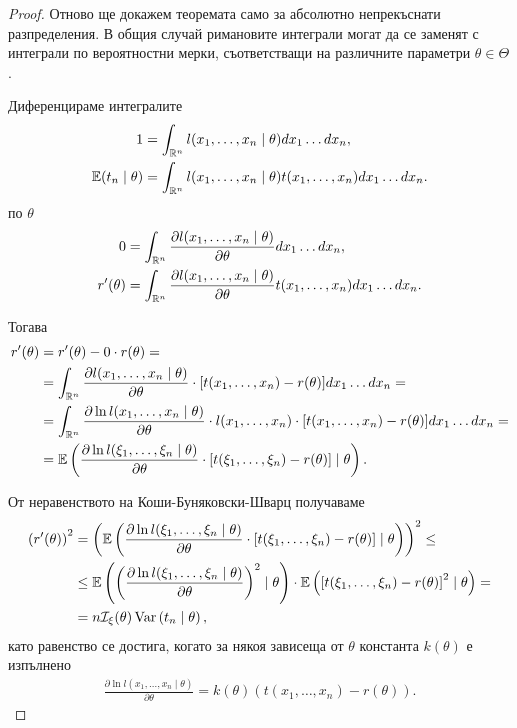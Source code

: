 \documentclass[numbers=endperiod, bibliography=totocnumbered]{scrartcl}
\begin{document}
\begin{proof}
  Отново ще докажем теоремата само за абсолютно непрекъснати разпределения. В общия случай римановите интеграли могат да се заменят с интеграли по вероятностни мерки, съответстващи на различните параметри \( \theta \in \Theta \).

  Диференцираме интегралите
  \begin{align*}
     1 &= \int_{\mathbb{R}^n} l(x_1, \ldots, x_n \mid \theta) dx_1 \ldots dx_n,
     \\
     \mathbb{E}(t_n \mid \theta) &= \int_{\mathbb{R}^n} l(x_1, \ldots, x_n \mid \theta) t(x_1, \ldots, x_n) dx_1 \ldots dx_n.
  \end{align*}
  по \( \theta \)
  \begin{align*}
     0 &= \int_{\mathbb{R}^n} \frac {\partial l(x_1, \ldots, x_n \mid \theta)} {\partial \theta} dx_1 \ldots dx_n,
     \\
     r'(\theta) &= \int_{\mathbb{R}^n} \frac {\partial l(x_1, \ldots, x_n \mid \theta)} {\partial \theta} t(x_1, \ldots, x_n) dx_1 \ldots dx_n.
  \end{align*}

  Тогава
  \begin{align*}
    r'(\theta)
    &=
    r'(\theta) - 0 \cdot r(\theta)
    = \\ &=
    \int_{\mathbb{R}^n} \frac {\partial l(x_1, \ldots, x_n \mid \theta)} {\partial \theta} \cdot [t(x_1, \ldots, x_n) - r(\theta)] dx_1 \ldots dx_n
    = \\ &=
    \int_{\mathbb{R}^n} \frac {\partial \ln l(x_1, \ldots, x_n \mid \theta)} {\partial \theta} \cdot l(x_1, \ldots, x_n) \cdot [t(x_1, \ldots, x_n) - r(\theta)] dx_1 \ldots dx_n
    = \\ &=
    \mathbb{E} \left( \frac {\partial \ln l(\xi_1, \ldots, \xi_n \mid \theta)} {\partial \theta} \cdot [t(\xi_1, \ldots, \xi_n) - r(\theta)] \mid \theta \right).
  \end{align*}

  От неравенството на Коши-Буняковски-Шварц получаваме
  \begin{align*}
    {\left(r'(\theta) \right)}^2
    &=
    {\left( \mathbb{E} \left( \frac {\partial \ln l(\xi_1, \ldots, \xi_n \mid \theta)} {\partial \theta} \cdot [t(\xi_1, \ldots, \xi_n) - r(\theta)] \mid \theta \right)\right)}^2
    \leq \\ &\leq
    \mathbb{E} \left( {\left(\frac {\partial \ln l(\xi_1, \ldots, \xi_n \mid \theta)} {\partial \theta} \right)}^2 \mid \theta \right) \cdot \mathbb{E} \left( {\left[t(\xi_1, \ldots, \xi_n) - r(\theta) \right]}^2 \mid \theta \right)
    = \\ &=
    n \mathcal{I}_\xi(\theta) \operatorname{Var} \left( t_n \mid \theta \right),
  \end{align*}
  като равенство се достига, когато за някоя зависеща от \( \theta \) константа \( k(\theta) \) е изпълнено
  \begin{align*}
    \frac {\partial \ln l(x_1, \ldots, x_n \mid \theta)} {\partial \theta} = k(\theta) (t(x_1, \ldots, x_n) - r(\theta)).
  \end{align*}
\end{proof}
\end{document}
